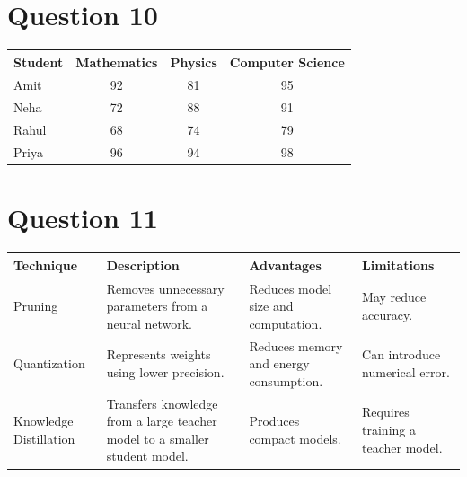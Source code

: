 \documentclass[12pt,a4paper]{article}
\begin{document}
	\section*{Question 10}
	
	\begin{center}
		\begin{tabular}{|l|c|c|c|}
			\hline
			\rowcolor{blue!60}
			\color{white}\textbf{Student} &
			\color{white}\textbf{Mathematics} &
			\color{white}\textbf{Physics} &
			\color{white}\textbf{Computer Science} \\
			\hline
			Amit &
			\cellcolor{green!20}92 &
			\cellcolor{yellow!25}81 &
			\cellcolor{green!20}95 \\
			\hline
			Neha &
			\cellcolor{red!20}72 &
			\cellcolor{yellow!25}88 &
			\cellcolor{green!20}91 \\
			\hline
			Rahul &
			\cellcolor{red!20}68 &
			\cellcolor{red!20}74 &
			\cellcolor{yellow!25}79 \\
			\hline
			Priya &
			\cellcolor{green!20}96 &
			\cellcolor{green!20}94 &
			\cellcolor{green!20}98 \\
			\hline
		\end{tabular}
	\end{center}
	
	\section*{Question 11}
	
	\begin{center}
		\small
		
		\begin{tabular}{|
				p{2.2cm} |
				p{3.2cm} |
				p{3.2cm} |
				p{2.8cm} |
			}
			\hline
			\textbf{Technique} &
			\textbf{Description} &
			\textbf{Advantages} &
			\textbf{Limitations} \\
			\hline
			
			Pruning &
			Removes unnecessary parameters from a neural network. &
			Reduces model size and computation. &
			May reduce accuracy. \\
			\hline
			
			Quantization &
			Represents weights using lower precision. &
			Reduces memory and energy consumption. &
			Can introduce numerical error. \\
			\hline
			
			Knowledge Distillation &
			Transfers knowledge from a large teacher model to a smaller student model. &
			Produces compact models. &
			Requires training a teacher model. \\
			\hline
		\end{tabular}
		
	\end{center}
	
\end{document}

